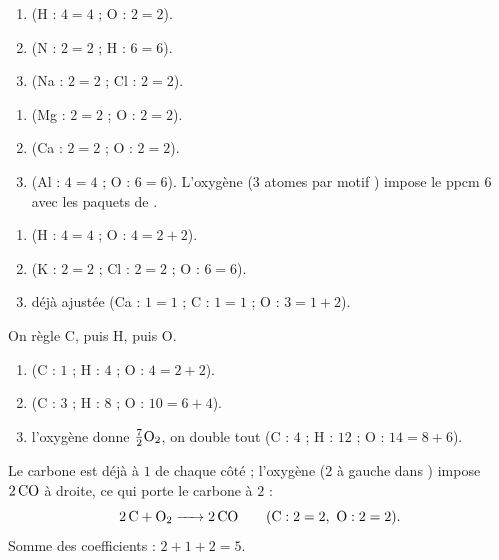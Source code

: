 \documentclass[11pt,a4paper]{article}
\begin{document}
\begin{corrige}
\begin{enumerate}[label=\alph*)]
  \item {} \; (H : $4=4$ ; O : $2=2$).
  \item {} \; (N : $2=2$ ; H : $6=6$).
  \item {} \; (Na : $2=2$ ; Cl : $2=2$).
\end{enumerate}
\end{corrige}

\begin{corrige}
\begin{enumerate}[label=\alph*)]
  \item {} \; (Mg : $2=2$ ; O : $2=2$).
  \item {} \; (Ca : $2=2$ ; O : $2=2$).
  \item {} \; (Al : $4=4$ ; O : $6=6$). L'oxygène ($3$ atomes par motif
        ) impose le ppcm $6$ avec les paquets de .
\end{enumerate}
\end{corrige}

\begin{corrige}[décompositions]
\begin{enumerate}[label=\alph*)]
  \item {} \; (H : $4=4$ ; O : $4=2+2$).
  \item {} \; (K : $2=2$ ; Cl : $2=2$ ; O : $6=6$).
  \item {} \; déjà ajustée (Ca : $1=1$ ; C : $1=1$ ; O : $3=1+2$).
\end{enumerate}
\end{corrige}

\begin{corrige}
On règle C, puis H, puis O.
\begin{enumerate}[label=\alph*)]
  \item {} \; (C : $1$ ; H : $4$ ; O : $4=2+2$).
  \item {} \; (C : $3$ ; H : $8$ ; O : $10=6+4$).
  \item {} \; l'oxygène donne $\tfrac{7}{2}\ce{O2}$, on double
        tout (C : $4$ ; H : $12$ ; O : $14=8+6$).
\end{enumerate}
\end{corrige}

\begin{corrige}
Le carbone est déjà à $1$ de chaque côté ; l'oxygène ($2$ à gauche dans ) impose $2\,\ce{CO}$
à droite, ce qui porte le carbone à $2$ :
\[
\ce{2 C + O2 -> 2 CO}\qquad(\text{C}:2=2,\ \text{O}:2=2).
\]
Somme des coefficients : $2+1+2=\boxed{5}$.
\end{corrige}
\end{document}
